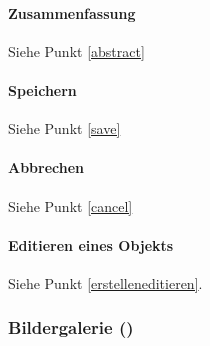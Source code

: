 \paragraph{Zusammenfassung}

Siehe Punkt \ref{abstract}


\paragraph{Speichern}

Siehe Punkt \ref{save}

\paragraph{Abbrechen}

Siehe Punkt \ref{cancel}


\paragraph{Editieren eines  Objekts}

Siehe Punkt \ref{erstelleneditieren}. 

\subsubsection{Bildergalerie ()}
\label{gallery}

